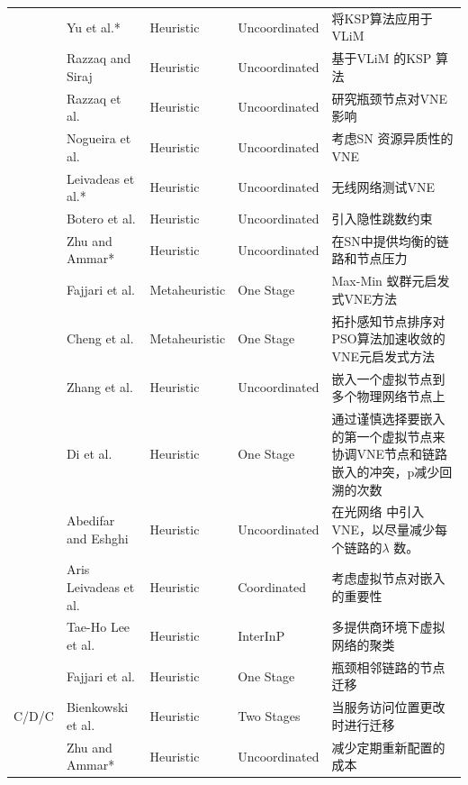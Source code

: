 \begin{longtable}[h]{@{}lm{}m{}m{}m{}}
 & Yu et al.*  \cite{yu2008rethinking}  & Heuristic & Uncoordinated & 将KSP算法\cite{eppstein1998finding}应用于VLiM\\
 & Razzaq and Siraj  \cite{razzaq2010approach}  & Heuristic & Uncoordinated & 基于VLiM 的KSP 算法\\
 & Razzaq et al.  \cite{razzaq2011minimizing}  & Heuristic & Uncoordinated & 研究瓶颈节点对VNE影响\\
 & Nogueira et al.  \cite{nogueira2011virtual}  & Heuristic & Uncoordinated &  考虑SN 资源异质性的VNE\\
 & Leivadeas et al.*  \cite{leivadeas2011architecture}  & Heuristic & Uncoordinated & 无线网络测试VNE\\
 & Botero et al. \cite{botero2012optimal,botero2011flexible}  & Heuristic & Uncoordinated & 引入隐性跳数约束\\
 & Zhu and Ammar*  \cite{zhu2006algorithms}  & Heuristic & Uncoordinated & 在SN中提供均衡的链路和节点压力\\
 & Fajjari et al.  \cite{fajjari2011vne}  & Metaheuristic & One Stage & Max-Min 蚁群元启发式VNE方法\\
 & Cheng et al.  \cite{cheng2012virtual}  & Metaheuristic & One Stage & 拓扑感知节点排序\cite{cheng2011virtual}对PSO算法加速收敛的VNE元启发式方法\\
 & Zhang et al.  \cite{zhang2012virtual}  & Heuristic & Uncoordinated & 嵌入一个虚拟节点到多个物理网络节点上
\\
 & Di et al.  \cite{di2012efficient}  & Heuristic & One Stage & 通过谨慎选择要嵌入的第一个虚拟节点来协调VNE节点和链路嵌入的冲突，p减少回溯的次数\\
 & Abedifar and Eshghi  \cite{abedifar2012novel}  & Heuristic & Uncoordinated & 在光网络 中引入VNE，以尽量减少每个链路的$\lambda$ 数。\\
 & Aris Leivadeas et al.  \cite{leivadeas2012socio}  & Heuristic & Coordinated & 考虑虚拟节点对嵌入的重要性\\
 & Tae-Ho Lee et al.  \cite{lee2012graph}  & Heuristic & InterInP & 多提供商环境下虚拟网络的聚类\\
\hline
\multirow{7}{*}{C/D/C} & Fajjari et al.  \cite{fajjari2011vnr}  & Heuristic & One Stage & 瓶颈相邻链路的节点迁移\\
 & Bienkowski et al.  \cite{bienkowski2010competitive,bienkowski2014wide}  & Heuristic & Two Stages & 当服务访问位置更改时进行迁移\\
 & Zhu and Ammar*  \cite{zhu2006algorithms}  & Heuristic & Uncoordinated & 减少定期重新配置的成本\\

\end{longtable}
